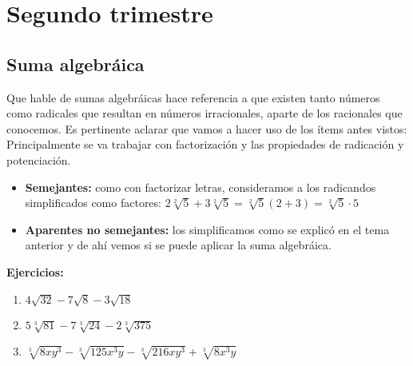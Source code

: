\documentclass[a4paper]{article}
\begin{document}
\section{Segundo trimestre}
\subsection{Suma algebráica}
Que hable de sumas algebráicas hace referencia a que existen tanto números como radicales que resultan en números irracionales, aparte de los racionales que conocemos. Es pertinente aclarar que vamos a hacer uso de los ítems antes vistos:\\
Principalmente se va trabajar con factorización y las propiedades de radicación y potenciación.
\begin{itemize}
    \item \textbf{Semejantes:} como con factorizar letras, consideramos a los radicandos simplificados como factores: $2\sqrt[2]{5}+3\sqrt[2]{5}=\sqrt[2]{5}(2+3)=\sqrt[2]{5}\cdot 5$
    \item \textbf{Aparentes no semejantes:} los simplificamos como se explicó en el tema anterior y de ahí vemos si se puede aplicar la suma algebráica. 
\end{itemize}

\textbf{Ejercicios:}
\begin{enumerate}
    \item $4\sqrt{32}-7\sqrt{8}-3\sqrt{18}$
    \item $5\sqrt[3]{81}-7\sqrt[3]{24}-2\sqrt[3]{375}$
    \item $\sqrt[3]{8xy^3}-\sqrt[3]{125x^3y}-\sqrt[3]{216xy^3}+\sqrt[3]{8x^3y}$
\end{enumerate}
\end{document}
